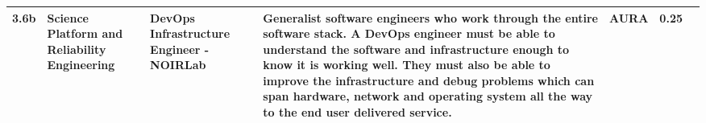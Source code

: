 \begin{longtable} {|l|p{}|p{}|p{}|l|l|l|}
{3.6b}&{Science Platform and Reliability Engineering}&{DevOps Infrastructure Engineer - NOIRLab}&{Generalist software engineers who work through the entire software stack. A DevOps engineer must be able to understand the software and infrastructure enough to know it is working well. They must also be able to improve the infrastructure and debug problems which can span hardware, network and operating system all the way to the end user delivered service. }&{AURA}&{0.25} \\ \hline
\end{longtable} \normalsize
